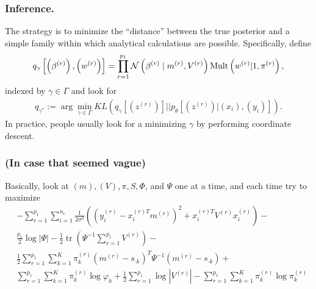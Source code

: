 \documentclass[10pt]{beamer}\usepackage[]{graphicx}\usepackage[]{color}
\providecommand{\tr}{\mathop\mathrm{tr}}
\def\absarg#1{\left|#1\right|}
\def\Gsn{\mathcal{N}}
\def\Mult{\textnormal{Mult}}
\begin{document}
\begin{frame}
  \frametitle{Inference.}
  The strategy is to minimize the ``distance'' between the true posterior and
  a simple family within which analytical calculations are possible.
  Specifically, define 
\begin{align*}
  q_{\gamma}\left[\left(\beta^{(r)}\right), \left(w^{(r)}\right)\right] = \prod_{r = 1}^{p_{1}}\Gsn\left(\beta^{(r)} \mid m^{(r)}, V^{(r)}\right)\Mult\left(w^{(r)} \vert 1, \pi^{(r)}\right),
\end{align*}
indexed by $\gamma \in \Gamma$ and look for
\begin{align*}
  q_{\gamma^{\ast}}:= \arg\min_{\gamma \in \Gamma} KL\left(q_{\gamma}\left[\left(z^{(r)}\right)\right] \vert \vert 
  p_{\theta}\left[\left(z^{(r)}\right) \vert \left(x_{i}\right), \left(y_{i}\right)\right]\right).
\end{align*}
In practice, people usually look for a minimizing $\gamma$ by performing
coordinate descent.
\end{frame}

\begin{frame}
  \frametitle{(In case that seemed vague)}
  Basically, look at $\left(m\right), \left(V\right), \pi, S, \Phi$, and $\Psi$ one at a time, and each time try to maximize
  \begin{align}
    & -\sum_{r = 1}^{p_{1}} \sum_{i = 1}^{n_{r}} \frac{1}{2\sigma^{2}}\left(\left(y_{i}^{(r)} - x_{i}^{(r) T}m^{(r)}\right)^{2} + x_{i}^{(r) T}V^{(r)}x_{i}^{(r)}\right) - \\
    &\frac{p_{1}}{2}\log\absarg{\Psi} -
     \frac{1}{2}\tr\left(\Psi^{-1}\sum_{r = 1}^{p_{1}}V^{(r)}\right) - \\
     &\frac{1}{2}\sum_{r = 1}^{p_{1}}\sum_{k = 1}^{K}\pi_{k}^{(r)}\left(m^{(r)} - s_{\cdot k}\right)^{T}\Psi^{-1}\left(m^{(r)} - s_{\cdot k}\right) + \\&\sum_{r = 1}^{p_{1}}\sum_{k = 1}^{K} \pi_{k}^{(r)}\log\varphi_{k} + \frac{1}{2}\sum_{r = 1}^{p_{1}}\log\absarg{V^{(r)}} - \sum_{r= 1}^{p_{1}}\sum_{k = 1}^{K}\pi_{k}^{(r)}\log \pi_{k}^{(r)}
  \end{align}
\end{frame}
\end{document}
